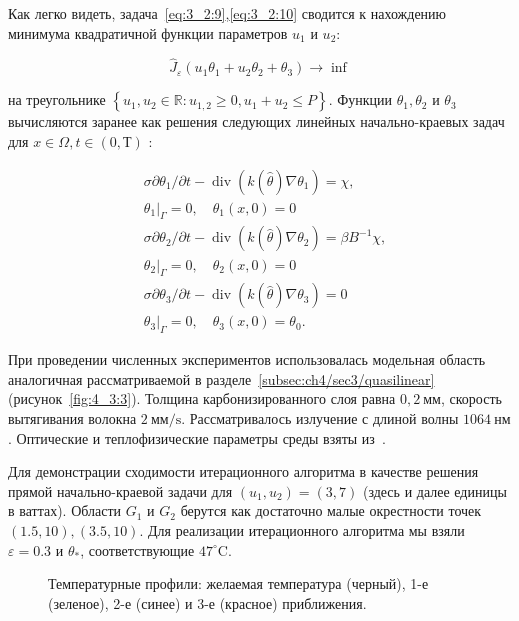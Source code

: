 Как легко видеть, задача~\eqref{eq:3_2:9},\eqref{eq:3_2:10} сводится к
нахождению минимума квадратичной функции параметров $u_{1}$ и $u_{2}$:

\[
    \widehat{J}_{\varepsilon}\left(u_{1} \theta_{1}+u_{2} \theta_{2}+\theta_{3}\right) \rightarrow \inf
\]

на треугольнике  $\left\{u_{1}, u_{2} \in \mathbb{R}:
u_{1,2} \geq 0, u_{1}+u_{2} \leq P\right\}$.
Функции $\theta_{1}, \theta_{2}$ и $\theta_{3}$
вычисляются заранее как решения следующих линейных
начально-краевых задач для $x \in \Omega, t \in(0, Т)$ :


\[
    \begin{aligned}
        &\sigma \partial \theta_{1} / \partial t-\operatorname{div}\left(k(\widehat{\theta})
        \nabla \theta_{1}\right)=\chi, \\
        &\left.\theta_{1}\right|_{\Gamma}=0, \quad \theta_{1}(x, 0)=0 \\
        &\sigma \partial \theta_{2} / \partial t-\operatorname{div}\left(k(\widehat{\theta})
        \nabla \theta_{2}\right)=\beta B^{-1} \chi, \\
        &\left.\theta_{2}\right|_{\Gamma}=0, \quad \theta_{2}(x, 0)=0 \\
        &\sigma \partial \theta_{3} / \partial t-\operatorname{div}\left(k(\widehat{\theta})
        \nabla \theta_{3}\right)=0 \\
        &\left.\theta_{3}\right|_{\Gamma}=0, \quad \theta_{3}(x, 0)=\theta_{0}.
    \end{aligned}
\]

При проведении численных экспериментов использовалась модельная область
аналогичная рассматриваемой в разделе~\ref{subsec:ch4/sec3/quasilinear}
(рисунок~\ref{fig:4_3:3}).
Толщина карбонизированного слоя равна $0,2 \mathrm{~мм}$,
скорость вытягивания волокна $2 \mathrm{~мм}/\mathrm{s}$.
Рассматривалось излучение с длиной волны $1064 \mathrm{~нм}$.
Оптические и теплофизические параметры среды взяты
из~\cite{Opticalthermal_vanRuijven2014, Some_Poluektova2014, Endovenous_Malskat2014}.


Для демонстрации сходимости итерационного алгоритма в качестве
решения прямой начально-краевой задачи для $\left(u_{1}, u_{2}\right)=( 3,7)$
(здесь и далее единицы в ваттах).
Области $G_{1}$ и $G_{2}$ берутся как достаточно малые окрестности
точек $(1.5,10),(3.5,10)$.
Для реализации итерационного алгоритма мы взяли $\varepsilon=0.3$ и $\theta_{*}$,
соответствующие $47^{\circ} \mathrm{C}$.


\begin{figure}[ht]
    \caption{Температурные профили: желаемая температура (черный),
        1-е (зеленое), 2-е (синее) и 3-е (красное) приближения.}
    \label{fig:4_3:7}
\end{figure}



